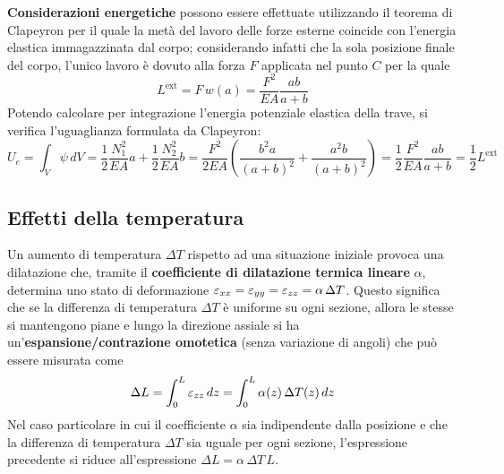 		\textbf{Considerazioni energetiche} possono essere effettuate utilizzando il teorema di Clapeyron per il quale la metà del lavoro delle forze esterne coincide con l'energia elastica immagazzinata dal corpo; considerando infatti che la sola posizione finale del corpo, l'unico lavoro è dovuto alla forza $F$ applicata nel punto $C$ per la quale
		\[ L^\textrm{ext} = F\, w(a) = \frac{F^2}{EA} \frac{ab}{a+b} \]
		Potendo calcolare per integrazione l'energia potenziale elastica della trave, si verifica l'uguaglianza formulata da Clapeyron:
		\[ U_e = \int_V \psi\, dV = \frac 1 2 \frac{N_1^2}{EA}a + \frac 1 2 \frac{N_2^2}{EA}b = \frac{F^2}{2EA} \left(\frac{b^2a}{(a+b)^2} + \frac{a^2b}{(a+b)^2} \right) = \frac 1 2\frac{F^2}{EA} \frac{ab}{a+b} = \frac 1 2 L^\textrm{ext} \]
	
	\subsection{Effetti della temperatura}
		Un aumento di temperatura $\Delta T$ rispetto ad una situazione iniziale provoca una dilatazione che, tramite il \textbf{coefficiente di dilatazione termica lineare} $\alpha$, determina uno stato di deformazione $\varepsilon_{xx} = \varepsilon_{yy} = \varepsilon_{zz} = \alpha\, \Delta T$. Questo significa che se la differenza di temperatura $\Delta T$ è uniforme su ogni sezione, allora le stesse si mantengono piane e lungo la direzione assiale si ha un'\textbf{espansione/contrazione omotetica} (senza variazione di angoli) che può essere misurata come
		\[ \Delta L = \int_0 ^L \varepsilon_{zz} \, dz = \int_0^L \alpha(z) \, \Delta T(z) \, dz \]
		Nel caso particolare in cui il coefficiente $\alpha$ sia indipendente dalla posizione e che la differenza di temperatura $\Delta T$ sia uguale per ogni sezione, l'espressione precedente si riduce all'espressione $\Delta L = \alpha\, \Delta T\, L$.
		
		
